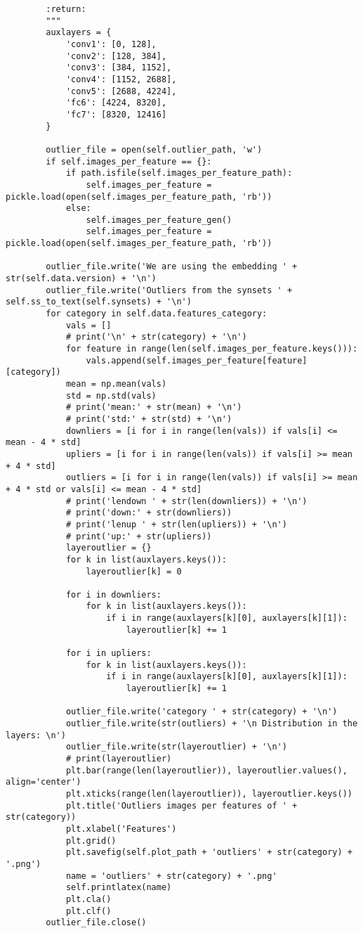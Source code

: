 \documentclass[12,twoside]{TFG-GM}
\theoremstyle{definition}
\theoremstyle{remark}
\begin{document}
\begin{verbatim}
        :return:
        """
        auxlayers = {
            'conv1': [0, 128],
            'conv2': [128, 384],
            'conv3': [384, 1152],
            'conv4': [1152, 2688],
            'conv5': [2688, 4224],
            'fc6': [4224, 8320],
            'fc7': [8320, 12416]
        }

        outlier_file = open(self.outlier_path, 'w')
        if self.images_per_feature == {}:
            if path.isfile(self.images_per_feature_path):
                self.images_per_feature = pickle.load(open(self.images_per_feature_path, 'rb'))
            else:
                self.images_per_feature_gen()
                self.images_per_feature = pickle.load(open(self.images_per_feature_path, 'rb'))

        outlier_file.write('We are using the embedding ' + str(self.data.version) + '\n')
        outlier_file.write('Outliers from the synsets ' + self.ss_to_text(self.synsets) + '\n')
        for category in self.data.features_category:
            vals = []
            # print('\n' + str(category) + '\n')
            for feature in range(len(self.images_per_feature.keys())):
                vals.append(self.images_per_feature[feature][category])
            mean = np.mean(vals)
            std = np.std(vals)
            # print('mean:' + str(mean) + '\n')
            # print('std:' + str(std) + '\n')
            downliers = [i for i in range(len(vals)) if vals[i] <= mean - 4 * std]
            upliers = [i for i in range(len(vals)) if vals[i] >= mean + 4 * std]
            outliers = [i for i in range(len(vals)) if vals[i] >= mean + 4 * std or vals[i] <= mean - 4 * std]
            # print('lendown ' + str(len(downliers)) + '\n')
            # print('down:' + str(downliers))
            # print('lenup ' + str(len(upliers)) + '\n')
            # print('up:' + str(upliers))
            layeroutlier = {}
            for k in list(auxlayers.keys()):
                layeroutlier[k] = 0

            for i in downliers:
                for k in list(auxlayers.keys()):
                    if i in range(auxlayers[k][0], auxlayers[k][1]):
                        layeroutlier[k] += 1

            for i in upliers:
                for k in list(auxlayers.keys()):
                    if i in range(auxlayers[k][0], auxlayers[k][1]):
                        layeroutlier[k] += 1

            outlier_file.write('category ' + str(category) + '\n')
            outlier_file.write(str(outliers) + '\n Distribution in the layers: \n')
            outlier_file.write(str(layeroutlier) + '\n')
            # print(layeroutlier)
            plt.bar(range(len(layeroutlier)), layeroutlier.values(), align='center')
            plt.xticks(range(len(layeroutlier)), layeroutlier.keys())
            plt.title('Outliers images per features of ' + str(category))
            plt.xlabel('Features')
            plt.grid()
            plt.savefig(self.plot_path + 'outliers' + str(category) + '.png')
            name = 'outliers' + str(category) + '.png'
            self.printlatex(name)
            plt.cla()
            plt.clf()
        outlier_file.close()


\end{verbatim}
\end{document}
